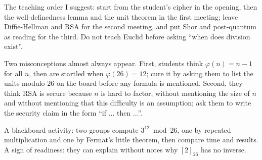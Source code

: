 \begin{untukdosen}
The teaching order I suggest: start from the student's cipher in the opening, then the
well-definedness lemma and the unit theorem in the first meeting; leave Diffie-Hellman and RSA for the
second meeting, and put Shor and post-quantum as reading for the third. Do not teach Euclid before
asking ``when does division exist''.

Two misconceptions almost always appear. First, students think $\varphi(n)=n-1$ for all $n$, then are
startled when $\varphi(26)=12$; cure it by asking them to list the units modulo $26$ on the board
before any formula is mentioned. Second, they think RSA is secure because $n$ is hard to factor,
without mentioning the size of $n$ and without mentioning that this difficulty is an assumption; ask
them to write the security claim in the form ``if ... then ...''.

A blackboard activity: two groups compute $3^{12}\bmod26$, one by repeated multiplication and one by
Fermat's little theorem, then compare time and results. A sign of readiness: they can explain without
notes why $[2]_{26}$ has no inverse.
\end{untukdosen}

